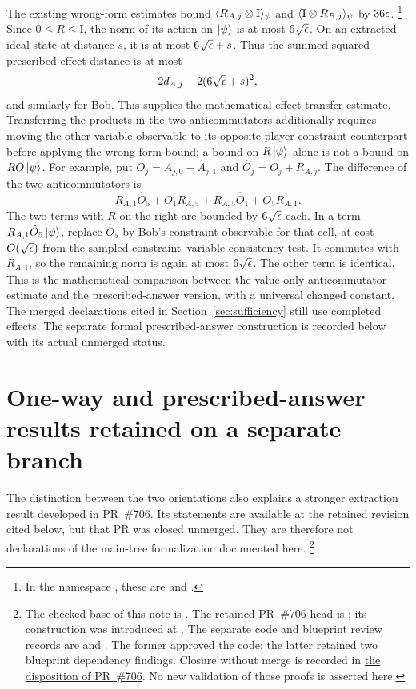 \documentclass[11pt]{article}
\newcommand{\Id}{\mathrm{I}}
\begin{document}
The existing wrong-form estimates bound $\langle R_{A,j}\ot\Id\rangle_\psi$
and $\langle\Id\ot R_{B,j}\rangle_\psi$ by $36\epsilon$.%
\footnote{In the namespace , these are
 and
.}
Since $0\le R\le\Id$,
the norm of its action on $\ket\psi$ is at most $6\sqrt{\epsilon}$. On an extracted
ideal state at distance $s$, it is at most $6\sqrt{\epsilon}+s$. Thus the summed
squared prescribed-effect distance is at most
\[
  2d_{A,j}+2(6\sqrt{\epsilon}+s)^2,
\]
and similarly for Bob. This supplies the mathematical effect-transfer
estimate. Transferring the products in the two anticommutators additionally
requires moving the other variable observable to its opposite-player
constraint counterpart before applying the wrong-form bound; a bound on
$R\ket\psi$ alone is not a bound on $RO\ket\psi$.
For example, put $O_j=A_{j,0}-A_{j,1}$ and
$\hat O_j=O_j+R_{A,j}$. The difference of the two anticommutators is
\[
  R_{A,1}\hat O_5+O_1R_{A,5}
    +R_{A,5}\hat O_1+O_5R_{A,1}.
\]
The two terms with $R$ on the right are bounded by $6\sqrt{\epsilon}$ each.
In a term $R_{A,1}\hat O_5\ket\psi$, replace $\hat O_5$ by Bob's
constraint observable for that cell, at cost $O(\sqrt{\epsilon})$ from the sampled
constraint--variable consistency test. It commutes with $R_{A,1}$, so the
remaining norm is again at most $6\sqrt{\epsilon}$. The other term is identical.
This is the mathematical comparison between the value-only anticommutator
estimate and the prescribed-answer version, with a universal changed constant.
The merged declarations cited in Section~\ref{sec:sufficiency} still use
completed effects. The separate formal prescribed-answer construction is
recorded below with its actual unmerged status.

\section{One-way and prescribed-answer results retained on a separate branch}
\label{sec:retained-one-way}

The distinction between the two orientations also explains a stronger
extraction result developed in PR~\#706. Its statements are available at the
retained revision cited below, but that PR was closed unmerged. They are
therefore not declarations of the main-tree formalization documented here.%
\footnote{The checked base of this note is
.
The retained PR~\#706 head is
; its construction was introduced
at . The separate code and blueprint review records are
and .
The former approved the code; the latter retained two blueprint dependency
findings. Closure without merge is recorded in
\href{https://github.com/Dengnifer/MIPStarRE-QPBT/pull/706\#issuecomment-5780224671}
{the disposition of PR~\#706}. No new validation of those proofs is asserted here.}
\end{document}
